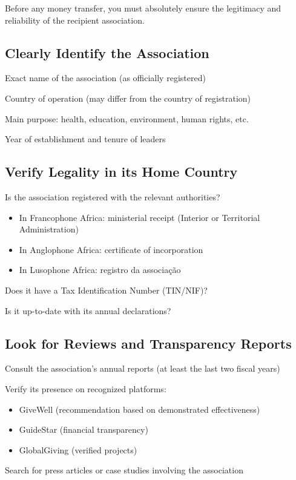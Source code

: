\documentclass[12pt, a4paper]{article}
\begin{document}
Before any money transfer, you must absolutely ensure the legitimacy and reliability of the recipient association.

\subsection{Clearly Identify the Association}
\begin{checklist}
    \item Exact name of the association (as officially registered)
    \item Country of operation (may differ from the country of registration)
    \item Main purpose: health, education, environment, human rights, etc.
    \item Year of establishment and tenure of leaders
\end{checklist}

\subsection{Verify Legality in its Home Country}
\begin{checklist}
    \item Is the association registered with the relevant authorities?
    \begin{itemize}
        \item In Francophone Africa: ministerial receipt (Interior or Territorial Administration)
        \item In Anglophone Africa: certificate of incorporation
        \item In Lusophone Africa: registro da associação
    \end{itemize}
    \item Does it have a Tax Identification Number (TIN/NIF)?
    \item Is it up-to-date with its annual declarations?
\end{checklist}

\subsection{Look for Reviews and Transparency Reports}
\begin{checklist}
    \item Consult the association's annual reports (at least the last two fiscal years)
    \item Verify its presence on recognized platforms:
    \begin{itemize}
        \item GiveWell (recommendation based on demonstrated effectiveness)
        \item GuideStar (financial transparency)
        \item GlobalGiving (verified projects)
    \end{itemize}
    \item Search for press articles or case studies involving the association
\end{checklist}
\end{document}

